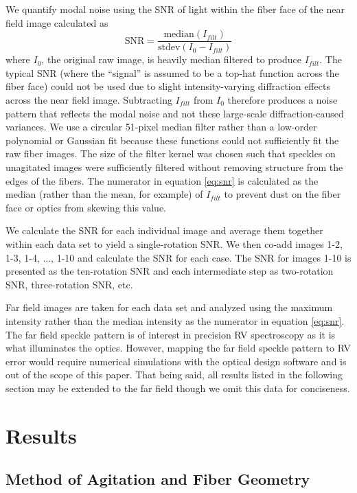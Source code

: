 \documentclass[twocolumn]{emulateapj}
\begin{document}
We quantify modal noise using the SNR of light within the fiber face of the near field image calculated as
\begin{equation}
\mathrm{SNR} = \frac{\mathrm{median}(I_{filt})}{\mathrm{stdev}(I_0 - I_{filt})}
\label{eq:snr}
\end{equation}
where $I_0$, the original raw image, is heavily median filtered to produce $I_{filt}$. The typical SNR (where the ``signal'' is assumed to be a top-hat function across the fiber face) could not be used due to slight intensity-varying diffraction effects across the near field image. Subtracting $I_{filt}$ from $I_0$ therefore produces a noise pattern that reflects the modal noise and not these large-scale diffraction-caused variances. We use a circular 51-pixel median filter rather than a low-order polynomial or Gaussian fit because these functions could not sufficiently fit the raw fiber images. The size of the filter kernel was chosen such that speckles on unagitated images were sufficiently filtered without removing structure from the edges of the fibers. The numerator in equation \ref{eq:snr} is calculated as the median (rather than the mean, for example) of $I_{filt}$ to prevent dust on the fiber face or optics from skewing this value.

We calculate the SNR for each individual image and average them together within each data set to yield a single-rotation SNR. We then co-add images 1-2, 1-3, 1-4, ..., 1-10 and calculate the SNR for each case. The SNR for images 1-10 is presented as the ten-rotation SNR and each intermediate step as two-rotation SNR, three-rotation SNR, etc.

Far field images are taken for each data set and analyzed using the maximum intensity rather than the median intensity as the numerator in equation \ref{eq:snr}. The far field speckle pattern is of interest in precision RV spectroscopy as it is what illuminates the optics. However, mapping the far field speckle pattern to RV error would require numerical simulations with the optical design software and  is out of the scope of this paper. That being said, all results listed in the following section may be extended to the far field though we omit this data for conciseness.

\section{Results}
\label{sec:results}

\subsection{Method of Agitation and Fiber Geometry}
\label{subsec:ag_snr}
\end{document}
